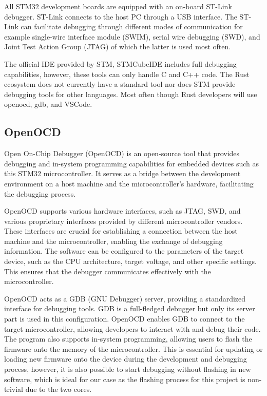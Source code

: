 All STM32 development boards are equipped with an on-board ST-Link debugger. ST-Link connects to the host PC through a USB interface. The ST-Link can facilitate debugging through different modes of communication for example single-wire interface module (SWIM), serial wire debugging (SWD), and Joint Test Action Group (JTAG) of which the latter is used most often.

The official IDE provided by STM, STMCubeIDE includes full debugging capabilities, however, these tools can only handle C and C++ code. The Rust ecosystem does not currently have a standard tool nor does STM provide debugging tools for other languages. Most often though Rust developers will use openocd, gdb, and VSCode.

\subsection{OpenOCD}

Open On-Chip Debugger (OpenOCD) is an open-source tool that provides debugging and in-system programming capabilities for embedded devices such as this STM32 microcontroller. It serves as a bridge between the development environment on a host machine and the microcontroller's hardware, facilitating the debugging process.

OpenOCD supports various hardware interfaces, such as JTAG, SWD, and various proprietary interfaces provided by different microcontroller vendors. These interfaces are crucial for establishing a connection between the host machine and the microcontroller, enabling the exchange of debugging information. The software can be configured to the parameters of the target device, such as the CPU architecture, target voltage, and other specific settings. This ensures that the debugger communicates effectively with the microcontroller.

OpenOCD acts as a GDB (GNU Debugger) server, providing a standardized interface for debugging tools. GDB is a full-fledged debugger but only its server part is used in this configuration. OpenOCD enables GDB to connect to the target microcontroller, allowing developers to interact with and debug their code. The program also supports in-system programming, allowing users to flash the firmware onto the memory of the microcontroller. This is essential for updating or loading new firmware onto the device during the development and debugging process, however, it is also possible to start debugging without flashing in new software, which is ideal for our case as the flashing process for this project is non-trivial due to the two cores.


